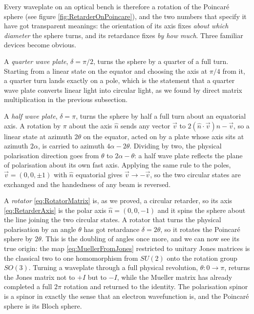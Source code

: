             Every waveplate on an optical bench is therefore a rotation of the Poincaré sphere (see figure \ref{fig:RetarderOnPoincare}), and the two numbers that specify it have got transparent meanings: the orientation of its axis fixes \textit{about which diameter} the sphere turns, and its retardance fixes \textit{by how much}. Three familiar devices become obvious.


            A \emph{quarter wave plate}, $\delta=\pi/2$, turns the sphere by a quarter of a full turn. Starting from a linear state on the equator and choosing the axis at $\pi/4$ from it, a quarter turn lands exactly on a pole, which is the statement that a quarter wave plate converts linear light into circular light, as we found by direct matrix multiplication in the previous subsection.

            A \emph{half wave plate}, $\delta=\pi$, turns the sphere by half a full turn about an equatorial axis. A rotation by $\pi$ about the axis $\hat n$ sends any vector $\vec{v}$ to $2(\hat n\cdot\vec v)\hat n-\vec v$, so a linear state at azimuth $2\theta$ on the equator, acted on by a plate whose axis sits at azimuth $2\alpha$, is carried to azimuth $4\alpha-2\theta$. Dividing by two, the physical polarisation direction goes from $\theta$ to $2\alpha-\theta$: a half wave plate reflects the plane of polarisation about its own fast axis. Applying the same rule to the poles, $\vec v=(0,0,\pm1)$ with $\hat n$ equatorial gives $\vec v\to-\vec v$, so the two circular states are exchanged and the handedness of any beam is reversed.

            A \emph{rotator} \ref{eq:RotatorMatrix} is, as we proved, a circular retarder, so its axis \ref{eq:RetarderAxis} is the polar axis $\hat n=(0,0,-1)$ and it spins the sphere about the line joining the two circular states. A rotator that turns the physical polarisation by an angle $\theta$ has got retardance $\delta=2\theta$, so it rotates the Poincaré sphere by $2\theta$. This is the doubling of angles once more, and we can now see its true origin: the map \ref{eq:MuellerFromJones} restricted to unitary Jones matrices is the classical two to one homomorphism from $SU(2)$ onto the rotation group $SO(3)$. Turning a waveplate through a full physical revolution, $\theta:0\to\pi$, returns the Jones matrix not to $+I$ but to $-I$, while the Mueller matrix has already completed a full $2\pi$ rotation and returned to the identity. The polarisation spinor is a spinor in exactly the sense that an electron wavefunction is, and the Poincaré sphere is its Bloch sphere.

